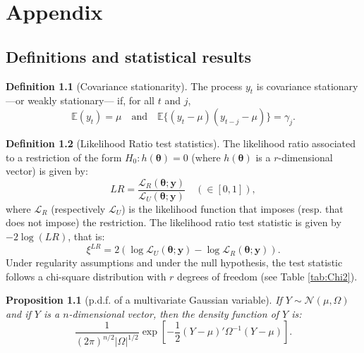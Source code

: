 \documentclass[
  12pt,
]{book}
\newtheorem{proposition}{Proposition}[chapter]
\theoremstyle{definition}
\newtheorem{definition}{Definition}[chapter]
\theoremstyle{definition}
\theoremstyle{definition}
\theoremstyle{definition}
\theoremstyle{remark}
\begin{document}
\hypertarget{append}{%
\chapter{Appendix}\label{append}}

\hypertarget{definitions-and-statistical-results}{%
\section{Definitions and statistical results}\label{definitions-and-statistical-results}}

\begin{definition}[Covariance stationarity]
\protect\hypertarget{def:covstat}{}\label{def:covstat}The process \(y_t\) is covariance stationary ---or weakly stationary--- if, for all \(t\) and \(j\),
\[
\mathbb{E}(y_t) = \mu \quad \mbox{and} \quad \mathbb{E}\{(y_t - \mu)(y_{t-j} - \mu)\} = \gamma_j.
\]
\end{definition}

\begin{definition}[Likelihood Ratio test statistics]
\protect\hypertarget{def:LR}{}\label{def:LR}The likelihood ratio associated to a restriction of the form \(H_0: h({\boldsymbol\theta})=0\) (where \(h({\boldsymbol\theta})\) is a \(r\)-dimensional vector) is given by:
\[
LR = \frac{\mathcal{L}_R(\boldsymbol\theta;\mathbf{y})}{\mathcal{L}_U(\boldsymbol\theta;\mathbf{y})} \quad (\in [0,1]),
\]
where \(\mathcal{L}_R\) (respectively \(\mathcal{L}_U\)) is the likelihood function that imposes (resp. that does not impose) the restriction. The likelihood ratio test statistic is given by \(-2\log(LR)\), that is:
\[
\boxed{\xi^{LR}= 2 (\log\mathcal{L}_U(\boldsymbol\theta;\mathbf{y})-\log\mathcal{L}_R(\boldsymbol\theta;\mathbf{y})).}
\]
Under regularity assumptions and under the null hypothesis, the test statistic follows a chi-square distribution with \(r\) degrees of freedom (see Table \ref{tab:Chi2}).
\end{definition}

\begin{proposition}[p.d.f. of a multivariate Gaussian variable]
\protect\hypertarget{prp:pdfMultivarGaussian}{}\label{prp:pdfMultivarGaussian}If \(Y \sim \mathcal{N}(\mu,\Omega)\) and if \(Y\) is a \(n\)-dimensional vector, then the density function of \(Y\) is:
\[
\frac{1}{(2 \pi)^{n/2}|\Omega|^{1/2}}\exp\left[-\frac{1}{2}\left(Y-\mu\right)'\Omega^{-1}\left(Y-\mu\right)\right].
\]
\end{proposition}
\end{document}
